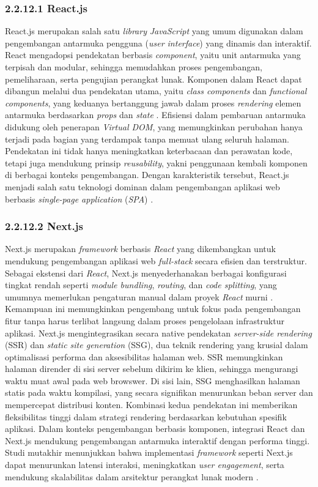 \subsubsection{2.2.12.1 React.js}

React.js merupakan salah satu \emph{library} \emph{JavaScript} yang umum digunakan dalam pengembangan antarmuka pengguna (\emph{user interface}) yang dinamis dan interaktif. React mengadopsi pendekatan berbasis \emph{component}, yaitu unit antarmuka yang terpisah dan modular, sehingga memudahkan proses pengembangan, pemeliharaan, serta pengujian perangkat lunak. Komponen dalam React dapat dibangun melalui dua pendekatan utama, yaitu \emph{class components} dan \emph{functional components}, yang keduanya bertanggung jawab dalam proses \emph{rendering} elemen antarmuka berdasarkan \emph{props} dan \emph{state} \cite{Panjaitan2021}. Efisiensi dalam pembaruan antarmuka didukung oleh penerapan \emph{Virtual DOM}, yang memungkinkan perubahan hanya terjadi pada bagian yang terdampak tanpa memuat ulang seluruh halaman. Pendekatan ini tidak hanya meningkatkan keterbacaan dan perawatan kode, tetapi juga mendukung prinsip \emph{reusability}, yakni penggunaan kembali komponen di berbagai konteks pengembangan. Dengan karakteristik tersebut, React.js menjadi salah satu teknologi dominan dalam pengembangan aplikasi web berbasis \emph{single-page application} (\emph{SPA}) \cite{Panjaitan2021}.

\subsubsection{2.2.12.2 Next.js}
Next.js merupakan \emph{framework} berbasis \emph{React} yang dikembangkan untuk mendukung pengembangan aplikasi web \emph{full-stack} secara efisien dan terstruktur. Sebagai ekstensi dari \emph{React}, Next.js menyederhanakan berbagai konfigurasi tingkat rendah seperti \emph{module bundling}, \emph{routing}, dan \emph{code splitting}, yang umumnya memerlukan pengaturan manual dalam proyek \emph{React} murni \cite{Nextjs2024}. Kemampuan ini memungkinkan pengembang untuk fokus pada pengembangan fitur tanpa harus terlibat langsung dalam proses pengelolaan infrastruktur aplikasi. Next.js mengintegrasikan secara native pendekatan \emph{server-side rendering} (SSR) dan \emph{static site generation} (SSG), dua teknik rendering yang krusial dalam optimalisasi performa dan aksesibilitas halaman web. SSR memungkinkan halaman dirender di sisi server sebelum dikirim ke klien, sehingga mengurangi waktu muat awal pada web browswer. Di sisi lain, SSG menghasilkan halaman statis pada waktu kompilasi, yang secara signifikan menurunkan beban server dan mempercepat distribusi konten. Kombinasi kedua pendekatan ini memberikan fleksibilitas tinggi dalam strategi rendering berdasarkan kebutuhan spesifik aplikasi. Dalam konteks pengembangan berbasis komponen, integrasi React dan Next.js mendukung pengembangan antarmuka interaktif dengan performa tinggi. Studi mutakhir menunjukkan bahwa implementasi \emph{framework} seperti Next.js dapat menurunkan latensi interaksi, meningkatkan \emph{user engagement}, serta mendukung skalabilitas dalam arsitektur perangkat lunak modern \cite{Nextjs2024}.

